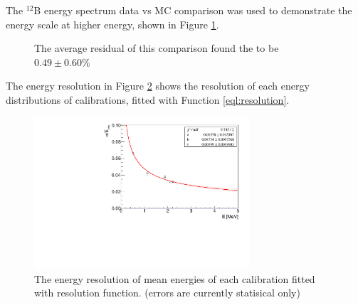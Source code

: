 The $^{12}$B energy spectrum data vs MC comparison was used to demonstrate the energy scale at higher energy, shown in Figure \ref{fig:B12final}. 

\begin{figure}[h!]
\centering
{} \quad
{} \quad
\caption{The average residual of this comparison found the to be $0.49 \pm 0.60\%$}
\label{fig:B12final}
\end{figure}

The energy resolution in Figure \ref{fig:resolution} shows the resolution of each energy distributions of calibrations, fitted with Function \ref{eql:resolution}.

\begin{figure}[h!]
\centering
\includegraphics[width=80mm]{figures/Resolution.pdf}
\caption{The energy resolution of mean energies of each calibration fitted with resolution function. (errors are currently statisical only)}
\label{fig:resolution}
\end{figure}

